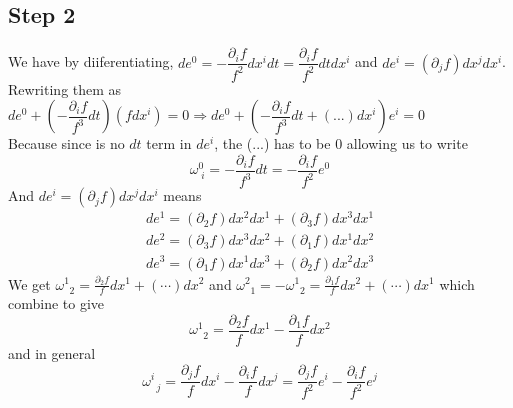 ﻿\documentclass[12pt,a4paper]{article}
\begin{document}
\subsection{Step 2}
We have by diiferentiating, $de^{0}=-\dfrac{\partial_{i}f}{f^{2}}dx^{i}dt=\dfrac{\partial_{i}f}{f^{2}}dtdx^{i}$ \; and \; $de^{i}=(\partial_{j}f)dx^{j}dx^{i}$.\\
Rewriting them as $de^{0}+\left(-\dfrac{\partial_{i}f}{f^{3}}dt\right)(fdx^{i})=0 \Rightarrow de^{0}+\left(-\dfrac{\partial_{i}f}{f^{3}}dt+(...)dx^{i}\right)e^{i}=0$\\ 
Because since is no $dt$ term in $de^{i}$, the (...) has to be $0$ allowing us to write 
$$\omega^{0}_{\;i}=-\dfrac{\partial_{i}f}{f^{3}}dt=-\dfrac{\partial_{i}f}{f^{2}}e^{0}$$
And $de^{i}=(\partial_{j}f)dx^{j}dx^{i}$ means 
$$
\begin{array}{l}
d e^{1}=\left(\partial_{2} f\right) d x^{2} d x^{1}+\left(\partial_{3} f\right) d x^{3} d x^{1} \\
d e^{2}=\left(\partial_{3} f\right) d x^{3} d x^{2}+\left(\partial_{1} f\right) d x^{1} d x^{2} \\
d e^{3}=\left(\partial_{1} f\right) d x^{1} d x^{3}+\left(\partial_{2} f\right) d x^{2} d x^{3} 
\end{array}
$$
We get
$\omega_{\;\;2}^{1}=\frac{\partial_{2} f}{f} d x^{1}+(\cdots) d x^{2}$ and $\omega^{2}_{\;\;1}=-\omega^{1}_{\;\;2}=\frac{\partial_{1} f}{f} d x^{2}+(\cdots) d x^{1}$ which combine to give
$$\omega_{\;\;2}^{1}=\frac{\partial_{2} f}{f} d x^{1}-\frac{\partial_{1} f}{f} d x^{2}$$ 
and in general 
$$\omega_{\;\;j}^{i}=\frac{\partial_{j} f}{f} d x^{i}-\frac{\partial_{i} f}{f} d x^{j}=\frac{\partial_{j} f}{f^{2}} e^{i}-\frac{\partial_{i} f}{f^{2}} e^{j}$$ 
\end{document}
